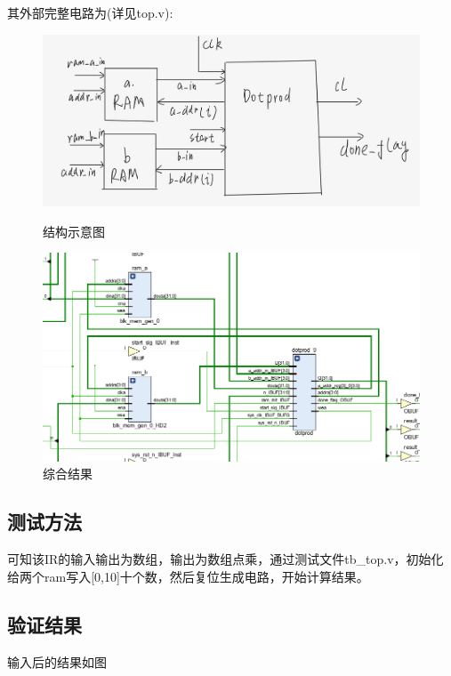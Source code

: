 \documentclass[12pt,hyperref,a4paper,UTF8]{ctexart}
\begin{document}
其外部完整电路为(详见top.v):

\begin{figure}[htbp]
    \centering
    \begin{minipage}{0.45\textwidth}
        \includegraphics[width=\linewidth]{./figures/结构示意图.png}
        \caption{结构示意图}
        \label{fig:sub1}
    \end{minipage}
    \hfill %
    \begin{minipage}{0.45\textwidth}
        \includegraphics[width=\linewidth]{./figures/综合结果.png}
        \caption{综合结果}
        \label{fig:sub2}
    \end{minipage}
\end{figure}

\subsection{测试方法}

可知该IR的输入输出为数组，输出为数组点乘，通过测试文件tb_top.v，初始化给两个ram写入[0,10]十个数，然后复位生成电路，开始计算结果。

\subsection{验证结果}
输入后的结果如图
\end{document}
